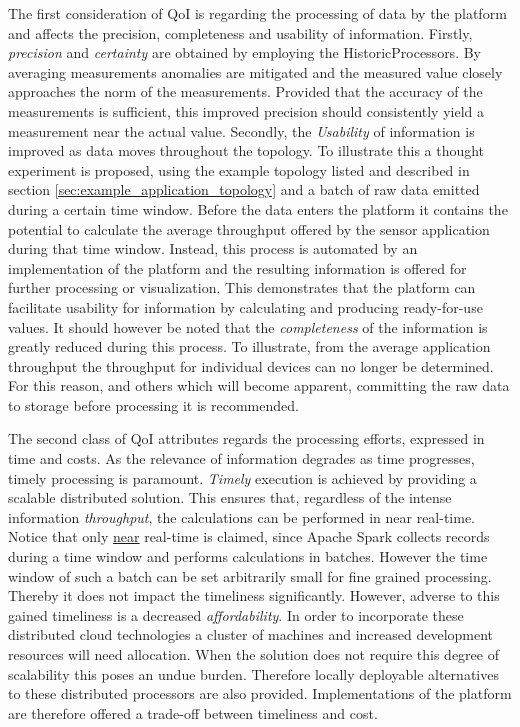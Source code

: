 The first consideration of QoI is regarding the processing of data by the platform and affects the precision, completeness and usability of information. Firstly, \emph{precision} and \emph{certainty} are obtained by employing the HistoricProcessors. By averaging measurements anomalies are mitigated and the measured value closely approaches the norm of the measurements. Provided that the accuracy of the measurements is sufficient, this improved precision should consistently yield a measurement near the actual value. Secondly, the \emph{Usability} of information is improved as data moves throughout the topology. To illustrate this a thought experiment is proposed, using the example topology listed and described in section \ref{sec:example_application_topology} and a batch of raw data emitted during a certain time window. Before the data enters the platform it contains the potential to calculate the average throughput offered by the sensor application during that time window. Instead, this process is automated by an implementation of the platform and the resulting information is offered for further processing or visualization. This demonstrates that the platform can facilitate usability for information by calculating and producing ready-for-use values. It should however be noted that the \emph{completeness} of the information is greatly reduced during this process. To illustrate, from the average application throughput the throughput for individual devices can no longer be determined. For this reason, and others which will become apparent, committing the raw data to storage before processing it is recommended.

The second class of QoI attributes regards the processing efforts, expressed in time and costs. As the relevance of information degrades as time progresses, timely processing is paramount. \emph{Timely} execution is achieved by providing a scalable distributed solution. This ensures that, regardless of the intense information \emph{throughput}, the calculations can be performed in near real-time. Notice that only \underline{near} real-time is claimed, since Apache Spark collects records during a time window and performs calculations in batches. However the time window of such a batch can be set arbitrarily small for fine grained processing. Thereby it does not impact the timeliness significantly. However, adverse to this gained timeliness is a decreased \emph{affordability}. In order to incorporate these distributed cloud technologies a cluster of machines and increased development resources will need allocation. When the solution does not require this degree of scalability this poses an undue burden. Therefore locally deployable alternatives to these distributed processors are also provided. Implementations of the platform are therefore offered a trade-off between timeliness and cost.
	
